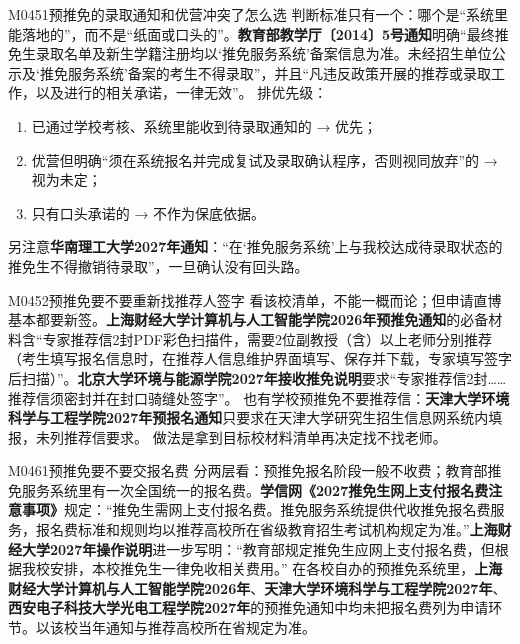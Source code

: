\begin{qa}{M0451}{预推免的录取通知和优营冲突了怎么选}
判断标准只有一个：哪个是“系统里能落地的”，而不是“纸面或口头的”。\textbf{教育部教学厅〔2014〕5号通知}明确“最终推免生录取名单及新生学籍注册均以‘推免服务系统’备案信息为准。未经招生单位公示及‘推免服务系统’备案的考生不得录取”，并且“凡违反政策开展的推荐或录取工作，以及进行的相关承诺，一律无效”。
排优先级：
\begin{enumerate}
  \item 已通过学校考核、系统里能收到待录取通知的 → 优先；
  \item 优营但明确“须在系统报名并完成复试及录取确认程序，否则视同放弃”的 → 视为未定；
  \item 只有口头承诺的 → 不作为保底依据。
\end{enumerate}
另注意\textbf{华南理工大学2027年通知}：“在‘推免服务系统’上与我校达成待录取状态的推免生不得撤销待录取”，一旦确认没有回头路。
\end{qa}

\begin{qa}{M0452}{预推免要不要重新找推荐人签字}
看该校清单，不能一概而论；但申请直博基本都要新签。\textbf{上海财经大学计算机与人工智能学院2026年预推免通知}的必备材料含“专家推荐信2封PDF彩色扫描件，需要2位副教授（含）以上老师分别推荐（考生填写报名信息时，在推荐人信息维护界面填写、保存并下载，专家填写签字后扫描）”。\textbf{北京大学环境与能源学院2027年接收推免说明}要求“专家推荐信2封……推荐信须密封并在封口骑缝处签字”。
也有学校预推免不要推荐信：\textbf{天津大学环境科学与工程学院2027年预报名通知}只要求在天津大学研究生招生信息网系统内填报，未列推荐信要求。
做法是拿到目标校材料清单再决定找不找老师。
\end{qa}

\begin{qa}{M0461}{预推免要不要交报名费}
分两层看：预推免报名阶段一般不收费；教育部推免服务系统里有一次全国统一的报名费。\textbf{学信网《2027推免生网上支付报名费注意事项》}规定：“推免生需网上支付报名费。推免服务系统提供代收推免报名费服务，报名费标准和规则均以推荐高校所在省级教育招生考试机构规定为准。”\textbf{上海财经大学2027年操作说明}进一步写明：“教育部规定推免生应网上支付报名费，但根据我校安排，本校推免生一律免收相关费用。”
在各校自办的预推免系统里，\textbf{上海财经大学计算机与人工智能学院2026年}、\textbf{天津大学环境科学与工程学院2027年}、\textbf{西安电子科技大学光电工程学院2027年}的预推免通知中均未把报名费列为申请环节。以该校当年通知与推荐高校所在省规定为准。
\end{qa}


